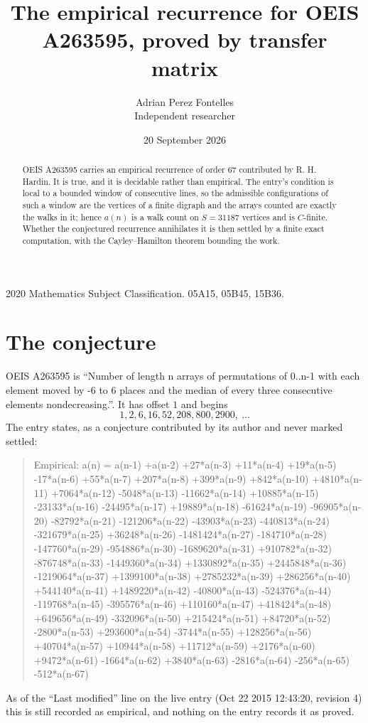 \documentclass[11pt,a4paper]{article}
\title{The empirical recurrence for OEIS A263595, proved by transfer matrix}
\author{Adrian Perez Fontelles\\ \small Independent researcher}
\date{20 September 2026}
\theoremstyle{plain}
\theoremstyle{definition}
\begin{document}
\maketitle

\begin{abstract}
OEIS A263595 carries an empirical recurrence of order $67$ contributed by R. H. Hardin. It is
true, and it is decidable rather than empirical. The entry's condition is local to a bounded window of consecutive lines, so
the admissible configurations of such a window are the vertices of a finite digraph and the
arrays counted are exactly the walks in it; hence $a(n)$ is a walk count on $S=31187$ vertices
and is $C$-finite. Whether the conjectured recurrence annihilates it is then settled by a
finite exact computation, with the Cayley--Hamilton theorem bounding the work.
\end{abstract}

\noindent\small 2020 Mathematics Subject Classification. 05A15, 05B45, 15B36.\normalsize

\section{The conjecture}

OEIS A263595 is ``Number of length n arrays of permutations of 0..n-1 with each element moved by -6 to 6 places and the median of every three consecutive elements nondecreasing.''. It has offset $1$ and begins
\[
1, 2, 6, 16, 52, 208, 800, 2900,\ \dots
\]
The entry states, as a conjecture contributed by its author and never marked settled:
\begin{quote}\raggedright\small
Empirical: a(n) = a(n-1) +a(n-2) +27*a(n-3) +11*a(n-4) +19*a(n-5) -17*a(n-6) +55*a(n-7) +207*a(n-8) +399*a(n-9) +842*a(n-10) +4810*a(n-11) +7064*a(n-12) -5048*a(n-13) -11662*a(n-14) +10885*a(n-15) -23133*a(n-16) -24495*a(n-17) +19889*a(n-18) -61624*a(n-19) -96905*a(n-20) -82792*a(n-21) -121206*a(n-22) -43903*a(n-23) -440813*a(n-24) -321679*a(n-25) +36248*a(n-26) -1481424*a(n-27) -184710*a(n-28) -147760*a(n-29) -954886*a(n-30) -1689620*a(n-31) +910782*a(n-32) -876748*a(n-33) -1449360*a(n-34) +1330892*a(n-35) +2445848*a(n-36) -1219064*a(n-37) +1399100*a(n-38) +2785232*a(n-39) +286256*a(n-40) +544140*a(n-41) +1489220*a(n-42) -40800*a(n-43) -524376*a(n-44) -119768*a(n-45) -395576*a(n-46) +110160*a(n-47) +418424*a(n-48) +649656*a(n-49) -332096*a(n-50) +215424*a(n-51) +84720*a(n-52) -2800*a(n-53) +293600*a(n-54) -3744*a(n-55) +128256*a(n-56) +40704*a(n-57) +10944*a(n-58) +11712*a(n-59) +2176*a(n-60) +9472*a(n-61) -1664*a(n-62) +3840*a(n-63) -2816*a(n-64) -256*a(n-65) -512*a(n-67)
\end{quote}
As of the ``Last modified'' line on the live entry (Oct 22 2015 12:43:20, revision 4) this is still
recorded as empirical, and nothing on the entry records it as proved.
\end{document}
